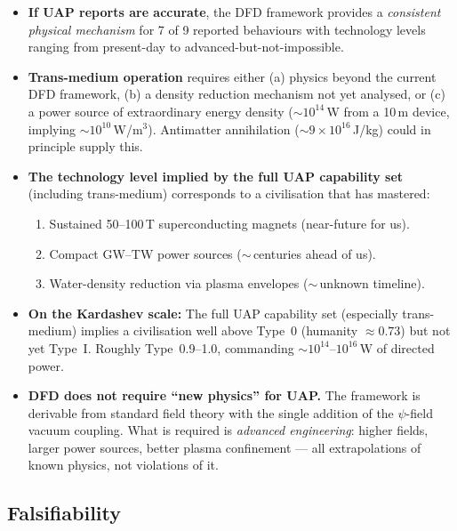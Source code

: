 \documentclass[12pt,a4paper]{article}
\begin{document}
\begin{tcolorbox}[colback=blue!5!white, colframe=blue!60!black,
  title=Summary Verdict]
\begin{itemize}
\item \textbf{If UAP reports are accurate}, the DFD framework
  provides a \emph{consistent physical mechanism} for 7 of 9 reported
  behaviours with technology levels ranging from present-day to
  advanced-but-not-impossible.

\item \textbf{Trans-medium operation} requires either (a) physics
  beyond the current DFD framework, (b) a density reduction mechanism
  not yet analysed, or (c) a power source of extraordinary energy
  density ($\sim 10^{14}$\,W from a 10\,m device, implying
  $\sim 10^{10}$\,W/m$^3$).  Antimatter annihilation
  ($\sim 9\times 10^{16}$\,J/kg) could in principle supply this.

\item \textbf{The technology level implied by the full UAP capability
  set} (including trans-medium) corresponds to a civilisation that has
  mastered:
  \begin{enumerate}
  \item Sustained 50--100\,T superconducting magnets (near-future for us).
  \item Compact GW--TW power sources ($\sim$\,centuries ahead of us).
  \item Water-density reduction via plasma envelopes ($\sim$\,unknown
    timeline).
  \end{enumerate}

\item \textbf{On the Kardashev scale:} The full UAP capability set
  (especially trans-medium) implies a civilisation well above Type~0
  (humanity $\approx 0.73$) but not yet Type~I.  Roughly Type~0.9--1.0,
  commanding $\sim 10^{14}$--$10^{16}$\,W of directed power.

\item \textbf{DFD does not require ``new physics'' for UAP.}
  The framework is derivable from standard field theory with the
  single addition of the $\psi$-field vacuum coupling.  What is
  required is \emph{advanced engineering}: higher fields, larger
  power sources, better plasma confinement --- all extrapolations
  of known physics, not violations of it.
\end{itemize}
\end{tcolorbox}

\subsection{Falsifiability}
\end{document}
